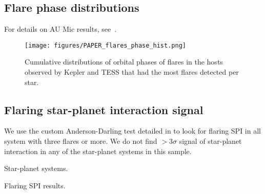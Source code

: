 \documentclass[twocolumn]{aastex631}
\begin{document}
\subsection{Flare phase distributions}

For details on AU Mic results, see~\citep{ilin2022searching}.

\begin{figure*}[ht!]
    \begin{centering}
        \texttt{[image: figures/PAPER\_flares\_phase\_hist.png]}
        \caption{
            Cumulative distributions of orbital phases of flares in the hosts observed by Kepler and TESS that had the most flares detected per star. 
        }
        \label{fig:cumdist_active}
    \end{centering}
\end{figure*}


\subsection{Flaring star-planet interaction signal}
We use the custom Anderson-Darling test detailed in \cite{ilin2022searching} to look for flaring SPI in all system with three flares or more. We do not find $>3\sigma$ signal of star-planet interaction in any of the star-planet systems in this sample.  



\begin{table*}
\movetableright=-20mm
\footnotesize
    \caption{Star-planet systems.}
    
        \label{tab:maintable_lit}
    \tablerefs{}
\end{table*}


\begin{table*}
\footnotesize
\movetableright=-20mm
    \caption{Flaring SPI results.}
    
        \label{tab:maintable_der}

\end{table*}


\end{document}
